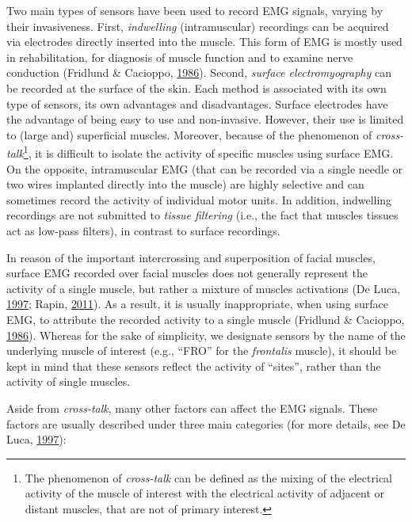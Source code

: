 \documentclass[a4paper,12pt,twoside,openright,oldfontcommands]{memoir}
\let\rmarkdownfootnote\footnote%
\def\footnote{\protect\rmarkdownfootnote}
\begin{document}
Two main types of sensors have been used to record EMG signals, varying by their invasiveness. First, \emph{indwelling} (intramuscular) recordings can be acquired via electrodes directly inserted into the muscle. This form of EMG is mostly used in rehabilitation, for diagnosis of muscle function and to examine nerve conduction (Fridlund \& Cacioppo, \protect\hyperlink{ref-fridlund_guidelines_1986}{1986}). Second, \emph{surface electromyography} can be recorded at the surface of the skin. Each method is associated with its own type of sensors, its own advantages and disadvantages. Surface electrodes have the advantage of being easy to use and non-invasive. However, their use is limited to (large and) superficial muscles. Moreover, because of the phenomenon of \emph{cross-talk}\footnote{The phenomenon of \emph{cross-talk} can be defined as the mixing of the electrical activity of the muscle of interest with the electrical activity of adjacent or distant muscles, that are not of primary interest.}, it is difficult to isolate the activity of specific muscles using surface EMG. On the opposite, intramuscular EMG (that can be recorded via a single needle or two wires implanted directly into the muscle) are highly selective and can sometimes record the activity of individual motor units. In addition, indwelling recordings are not submitted to \emph{tissue filtering} (i.e., the fact that muscles tissues act as low-pass filters), in contrast to surface recordings.

In reason of the important intercrossing and superposition of facial muscles, surface EMG recorded over facial muscles does not generally represent the activity of a single muscle, but rather a mixture of muscles activations (De Luca, \protect\hyperlink{ref-de_luca_use_1997}{1997}; Rapin, \protect\hyperlink{ref-Rapin2011}{2011}). As a result, it is usually inappropriate, when using surface EMG, to attribute the recorded activity to a single muscle (Fridlund \& Cacioppo, \protect\hyperlink{ref-fridlund_guidelines_1986}{1986}). Whereas for the sake of simplicity, we designate sensors by the name of the underlying muscle of interest (e.g., \enquote{FRO} for the \emph{frontalis} muscle), it should be kept in mind that these sensors reflect the activity of \enquote{sites}, rather than the activity of single muscles.

Aside from \emph{cross-talk}, many other factors can affect the EMG signals. These factors are usually described under three main categories (for more details, see De Luca, \protect\hyperlink{ref-de_luca_use_1997}{1997}):
\end{document}
